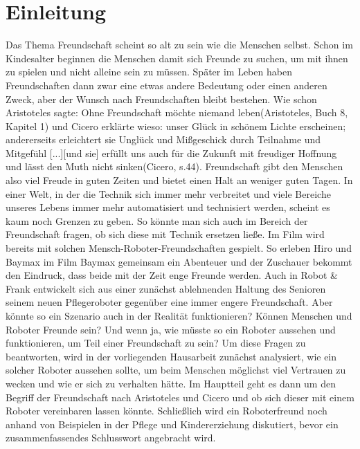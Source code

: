 \documentclass[12pt]{article}
\begin{document}
\section{Einleitung}
Das Thema Freundschaft scheint so alt zu sein wie die Menschen selbst. Schon im Kindesalter beginnen die Menschen damit sich Freunde zu suchen, um mit ihnen zu spielen und nicht alleine sein zu müssen. Später im Leben haben Freundschaften dann zwar eine etwas andere Bedeutung oder einen anderen Zweck, aber der Wunsch nach Freundschaften bleibt bestehen. Wie schon Aristoteles sagte: \glqq Ohne Freundschaft möchte niemand leben\grqq (Aristoteles, Buch 8, Kapitel 1) und Cicero erklärte wieso:  unser Glück in schönem Lichte erscheinen; andererseits erleichtert sie Unglück und Mißgeschick durch Teilnahme und Mitgefühl [...][und sie] erfüllt uns auch für die Zukunft mit freudiger Hoffnung und lässt den Muth nicht sinken\grqq (Cicero, s.44).\newline
Freundschaft gibt den Menschen also viel Freude in guten Zeiten und bietet einen Halt an weniger guten Tagen.\newline
In einer Welt, in der die Technik sich immer mehr verbreitet und viele Bereiche unseres Lebens immer mehr automatisiert und technisiert werden, scheint es kaum noch Grenzen zu geben. So könnte man sich auch im Bereich der Freundschaft fragen, ob sich diese mit Technik ersetzen ließe. \newline
Im Film wird bereits mit solchen Mensch-Roboter-Freundschaften gespielt. So erleben Hiro und Baymax im Film \glqq Baymax\grqq{} gemeinsam ein Abenteuer und der Zuschauer bekommt den Eindruck, dass beide mit der Zeit enge Freunde werden. Auch in Robot \& Frank entwickelt sich aus einer zunächst ablehnenden Haltung des Senioren seinem neuen Pflegeroboter gegenüber eine immer engere Freundschaft.\newline
Aber könnte so ein Szenario auch in der Realität funktionieren? Können Menschen und Roboter Freunde sein? Und wenn ja, wie müsste so ein Roboter aussehen und funktionieren, um Teil einer Freundschaft zu sein? Um diese Fragen zu beantworten, wird in der vorliegenden Hausarbeit zunächst analysiert, wie ein solcher Roboter aussehen sollte, um beim Menschen möglichst viel Vertrauen zu wecken und wie er sich zu verhalten hätte.\newline
Im Hauptteil geht es dann um den Begriff der Freundschaft nach Aristoteles und Cicero und ob sich dieser mit einem Roboter vereinbaren lassen könnte.\newline
Schließlich wird ein Roboterfreund noch anhand von Beispielen in der Pflege und Kindererziehung diskutiert, bevor ein zusammenfassendes Schlusswort angebracht wird.
\end{document}

